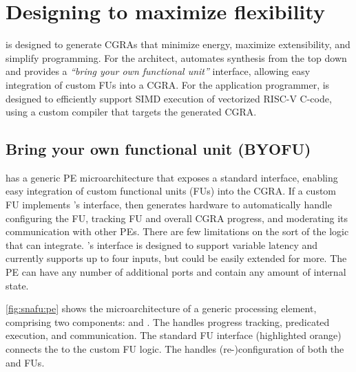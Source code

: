 \section{Designing \snafuframe to maximize flexibility}
\label{snafu:flexible}

\snafuframe is designed to generate CGRAs that minimize energy, maximize
extensibility, and simplify programming. 
%
For the architect, \snafuframe automates synthesis from the top down and
provides a \emph{``bring your own functional unit''} interface, allowing easy
integration of custom FUs into a CGRA.
% 
For the application programmer, \snafuframe is designed to efficiently support
SIMD execution of vectorized \mbox{RISC-V} C-code, using a custom compiler that targets the generated CGRA. 

\figSNAFUPE
\subsection{Bring your own functional unit (BYOFU)}
\label{snafu:flexible:byofu}
\snafuframe has a generic PE microarchitecture that exposes a
standard interface, enabling easy integration of custom functional units
(FUs) into the CGRA.
%
If a custom FU implements \snafuframe's interface, then \snafu generates hardware
to automatically handle configuring the FU, tracking FU and
overall CGRA progress, and moderating its communication with other PEs.
% 
There are few limitations on the sort of the logic that \snafuframe can integrate.
% 
\snafuframe's interface is designed to support variable latency and currently supports up to four inputs, but could be easily extended for more.
% 
The PE can have any number of additional ports and contain any amount of internal state.

\autoref{fig:snafu:pe} shows the microarchitecture of a generic \snafuframe processing element,
comprising two components: \ucore and \ucfg.
%
The \ucore handles progress tracking, predicated execution, and communication. 
%
The standard FU interface (highlighted orange) connects the
\ucore to the custom FU logic.  
%
The \ucfg handles (re-)configuration of both the \ucore and FUs.

